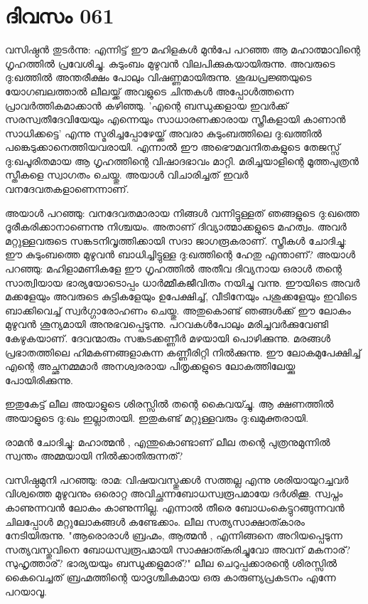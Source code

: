 \newpage
\section{ദിവസം 061}


വസിഷ്ഠന്‍ തുടര്‍ന്നു: എന്നിട്ട്‌ ഈ മഹിളകള്‍ മുന്‍പേ പറഞ്ഞ ആ മഹാത്മാവിന്റെ ഗൃഹത്തില്‍ പ്രവേശിച്ചു. കുടുംബം മുഴുവന്‍ വിലപിക്കുകയായിരുന്നു. അവരുടെ ദു:ഖത്തില്‍ അന്തരീക്ഷം പോലും വിഷണ്ണമായിരുന്നു. ശുദ്ധപ്രജ്ഞയുടെ യോഗബലത്താല്‍ ലീലയ്ക്ക്‌ അവളുടെ ചിന്തകള്‍ അപ്പോള്‍ത്തന്നെ പ്രാവര്‍ത്തികമാക്കാന്‍ കഴിഞ്ഞു. 'എന്റെ ബന്ധുക്കളായ ഇവര്‍ക്ക്‌ സരസ്വതീദേവിയേയും എന്നെയും സാധാരണക്കാരായ സ്ത്രീകളായി കാണാന്‍ സാധിക്കട്ടെ' എന്നു സ്മരിച്ചപ്പോഴേയ്ക്ക്‌ അവരാ കുടുംബത്തിലെ ദു:ഖത്തില്‍ പങ്കെടുക്കാനെത്തിയവരായി. എന്നാല്‍ ഈ അഭൌമവനിതകളുടെ തേജസ്സ്‌ ദു:ഖപൂരിതമായ ആ ഗൃഹത്തിന്റെ വിഷാദഭാവം മാറ്റി. മരിച്ചയാളിന്റെ മൂത്തപുത്രന്‍ സ്തീകളെ സ്വാഗതം ചെയ്തു. അയാള്‍ വിചാരിച്ചത്‌ ഇവര്‍ വനദേവതകളാണെന്നാണ്‌. 

അയാള്‍ പറഞ്ഞു: വനദേവതമാരായ നിങ്ങള്‍ വന്നിട്ടുള്ളത്‌ ഞങ്ങളുടെ ദു:ഖത്തെ ദൂരീകരിക്കാനാണെന്നു നിശ്ചയം. അതാണ്‌ ദിവ്യാത്മാക്കളുടെ മഹത്വം. അവര്‍ മറ്റുള്ളവരുടെ സങ്കടനിവൃത്തിക്കായി സദാ ജാഗരൂകരാണ്‌. സ്ത്രീകള്‍ ചോദിച്ചു: ഈ കുടുംബത്തെ മുഴുവന്‍ ബാധിച്ചിട്ടുള്ള ദു:ഖത്തിന്റെ ഹേതു എന്താണ്‌? അയാള്‍ പറഞ്ഞു: മഹിളാമണികളേ ഈ ഗൃഹത്തില്‍ അതീവ ദിവ്യനായ ഒരാള്‍ തന്റെ സാത്വിയായ ഭാര്യയോടൊപ്പം ധാര്‍മ്മീകജീവിതം നയിച്ചു വന്നു. ഈയിടെ അവര്‍ മക്കളേയും അവരുടെ കുട്ടികളേയും ഉപേക്ഷിച്ച്‌, വീടിനേയും പശുക്കളേയും ഇവിടെ ബാക്കിവെച്ച്‌ സ്വര്‍ഗ്ഗാരോഹണം ചെയ്തു. അതുകൊണ്ട്‌ ഞങ്ങള്‍ക്ക്‌ ഈ ലോകം മുഴുവന്‍ ശൂന്യമായി അനുഭവപ്പെടുന്നു. പറവകള്‍പോലും മരിച്ചവര്‍ക്കുവേണ്ടി കേഴുകയാണ്‌. ദേവന്മാരും സങ്കടക്കണ്ണീര്‍ മഴയായി പൊഴിക്കുന്നു. മരങ്ങള്‍ പ്രഭാതത്തിലെ ഹിമകണങ്ങളാകുന്ന കണ്ണീരിറ്റി നില്‍ക്കുന്നു. ഈ ലോകമുപേക്ഷിച്ച്‌ എന്റെ അച്ഛനമ്മമാര്‍ അനശ്വരരായ പിതൃക്കളുടെ ലോകത്തിലേയ്ക്കു പോയിരിക്കുന്നു.

ഇതുകേട്ട്‌ ലീല അയാളുടെ ശിരസ്സില്‍ തന്റെ കൈവയ്ച്ചു. ആ ക്ഷണത്തില്‍ അയാളുടെ ദു:ഖം ഇല്ലാതായി. ഇതുകണ്ട്‌ മറ്റുള്ളവരും ദു:ഖമുക്തരായി.

രാമന്‍ ചോദിച്ചു: മഹാത്മന്‍ , എന്തുകൊണ്ടാണ്‌ ലീല തന്റെ പുത്രനുമുന്നില്‍ സ്വന്തം അമ്മയായി നില്‍ക്കാതിരുന്നത്‌?

വസിഷ്ഠമുനി പറഞ്ഞു: രാമ: വിഷയവസ്തുക്കള്‍ സത്തല്ല എന്നു ശരിയായുറച്ചവര്‍ വിശ്വത്തെ മുഴുവനും ഒരൊറ്റ അവിച്ഛന്നബോധസ്വരൂപമായേ ദര്‍ശിക്കൂ. സ്വപ്നം കാണുന്നവന്‍ ലോകം കാണുന്നില്ല. എന്നാല്‍ തീരെ ബോധംകെട്ടുറങ്ങുന്നവന്‍ ചിലപ്പോള്‍ മറ്റുലോകങ്ങള്‍ കണ്ടേക്കാം. ലീല സത്യസാക്ഷാത്കാരം നേടിയിരുന്നു. "ആരൊരാള്‍ ബ്രഹ്മം, ആത്മന്‍ , എന്നിങ്ങനെ അറിയപ്പെടുന്ന സത്യവസ്തുവിനെ ബോധസ്വരൂപമായി സാക്ഷാത്കരിച്ചുവോ അവന്‌ മകനാര്‌? സുഹൃത്താര്‌? ഭാര്യയയും ബന്ധൂക്കളുമാര്‌?" ലീല ചെറുപ്പക്കാരന്റെ ശിരസ്സില്‍ കൈവെച്ചത്‌ ബ്രഹ്മത്തിന്റെ യാദൃശ്ചികമായ ഒരു കാരുണ്യപ്രകടനം എന്നേ പറയാവൂ.
